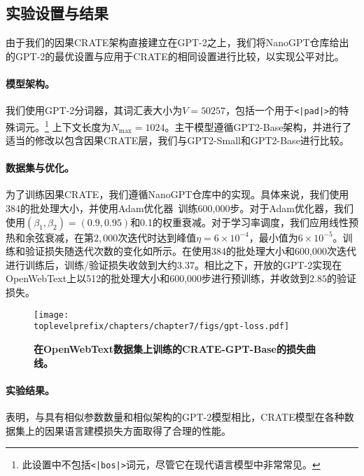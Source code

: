 \documentclass[../../book-main_zh.tex]{subfiles}
\begin{document}
\subsection{实验设置与结果}

由于我们的因果CRATE架构直接建立在GPT-2之上，我们将NanoGPT仓库\citep{nanogpt}给出的GPT-2的最优设置与应用于CRATE的相同设置进行比较，以实现公平对比。

\paragraph{模型架构。} 我们使用GPT-2分词器，其词汇表大小为\(V = 50257\)，包括一个用于\texttt{<|pad|>}的特殊词元。\footnote{此设置中不包括\texttt{<|bos|>}词元，尽管它在现代语言模型中非常常见。} 上下文长度为\(N_{\max} = 1024\)。主干模型遵循GPT2-Base架构\citep{radford2019language}，并进行了适当的修改以包含因果CRATE层，我们与GPT2-Small和GPT2-Base进行比较。

\paragraph{数据集与优化。} 为了训练因果CRATE，我们遵循NanoGPT仓库\citep{nanogpt}中的实现。具体来说，我们使用384的批处理大小，并使用Adam优化器~\citep{kingma2014adam}训练600,000步。对于Adam优化器，我们使用$(\beta_1, \beta_2)=(0.9, 0.95)$和0.1的权重衰减。对于学习率调度，我们应用线性预热和余弦衰减，在第$2,000$次迭代时达到峰值$\eta=6\times 10^{-4}$，最小值为$6\times 10^{-5}$。训练和验证损失随迭代次数的变化如所示。在使用384的批处理大小和600,000次迭代进行训练后，训练/验证损失收敛到大约$3.37$。相比之下，开放的GPT-2实现在OpenWebText上以512的批处理大小和600,000步进行预训练，并收敛到$2.85$的验证损失\citep{nanogpt}。

\begin{figure}
    \centering
    \texttt{[image: \\toplevelprefix/chapters/chapter7/figs/gpt-loss.pdf]}
    \caption{\bf 在OpenWebText数据集上训练的CRATE-GPT-Base的损失曲线。}
    \label{fig:crate-text-evals}
\end{figure}

\paragraph{实验结果。}

表明，与具有相似参数数量和相似架构的GPT-2模型相比，CRATE模型在各种数据集上的因果语言建模损失方面取得了合理的性能。
\end{document}
